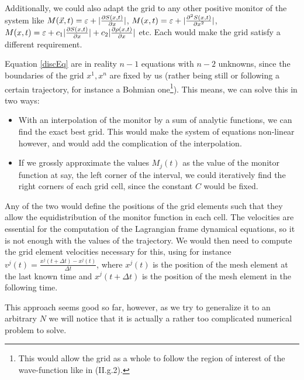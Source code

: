 \documentclass[11pt, a4paper]{article} %
\begin{document}
\newpage
Additionally, we could also adapt the grid to any other positive monitor of the system like $M(\vec{x},t)=\varepsilon+|\pdv{S(x,t)}{x}|$, $M(x,t)=\varepsilon+|\pdv[2]{S(x,t)}{x}|$, $M(x,t)=\varepsilon+c_1|\pdv{S(x,t)}{x}|+c_2|\pdv{\rho(x,t)}{x}|$ etc. Each would make the grid satisfy a different requirement.

Equation \eqref{discEq} are in reality $n-1$ equations with $n-2$ unknowns, since the boundaries of the grid $x^1, x^n$ are fixed by us (rather being still or following a certain trajectory, for instance a Bohmian one\footnote{This would allow the grid as a whole to follow the region of interest of the wave-function like in (II.g.2).}). This means, we can solve this in two ways: \vspace{-0.2cm}
\begin{itemize}
\item With an interpolation of the monitor by a sum of analytic functions, we can find the exact best grid. This would make the system of equations non-linear however, and would add the complication of the interpolation.

\item If we grossly approximate the values $M_j(t)$ as the value of the monitor function at say, the left corner of the interval, we could iteratively find the right corners of each grid cell, since the constant $C$ would be fixed.\vspace{-0.2cm}
\end{itemize}

Any of the two would define the positions of the grid elements such that they allow the equidistribution of the monitor function in each cell. The velocities are essential for the computation of the Lagrangian frame dynamical equations, so it is not enough with the values of the trajectory. We would then need to compute the grid element velocities necessary for this, using for instance $v^j(t)=\frac{x^j(t+\Delta t)-x^j(t)}{\Delta t}$, where $x^j(t)$ is the position of the mesh element at the last known time and $x^j(t+\Delta t)$ is the position of the mesh element in the following time.

This approach seems good so far, however, as we try to generalize it to an arbitrary $N$ we will notice that it is actually a rather too complicated numerical problem to solve.
\end{document}
